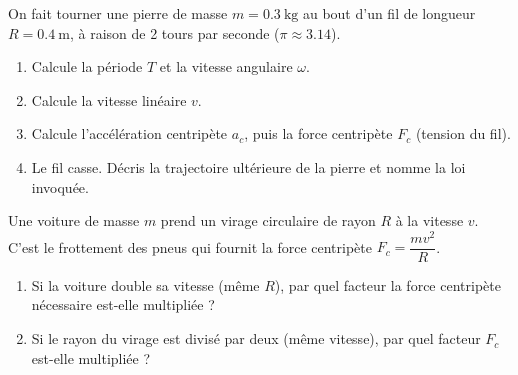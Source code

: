 \documentclass[11pt,a4paper]{article}
\begin{document}
\begin{exo}
On fait tourner une pierre de masse $m=\qty{0,3}{\kilogram}$ au bout d'un fil de longueur
$R=\qty{0,4}{\metre}$, à raison de \num{2} tours par seconde ($\pi\approx\num{3,14}$).
\begin{enumerate}[label=\alph*)]
  \item Calcule la période $T$ et la vitesse angulaire $\omega$.
  \item Calcule la vitesse linéaire $v$.
  \item Calcule l'accélération centripète $a_c$, puis la force centripète $F_c$ (tension du fil).
  \item Le fil casse. Décris la trajectoire ultérieure de la pierre et nomme la loi invoquée.
\end{enumerate}
\end{exo}

\begin{exo}
Une voiture de masse $m$ prend un virage circulaire de rayon $R$ à la vitesse $v$. C'est le frottement
des pneus qui fournit la force centripète $F_c=\dfrac{mv^2}{R}$.
\begin{enumerate}[label=\alph*)]
  \item Si la voiture double sa vitesse (même $R$), par quel facteur la force centripète nécessaire est-elle multipliée ?
  \item Si le rayon du virage est divisé par deux (même vitesse), par quel facteur $F_c$ est-elle multipliée ?
\end{enumerate}
\end{exo}
\end{document}
